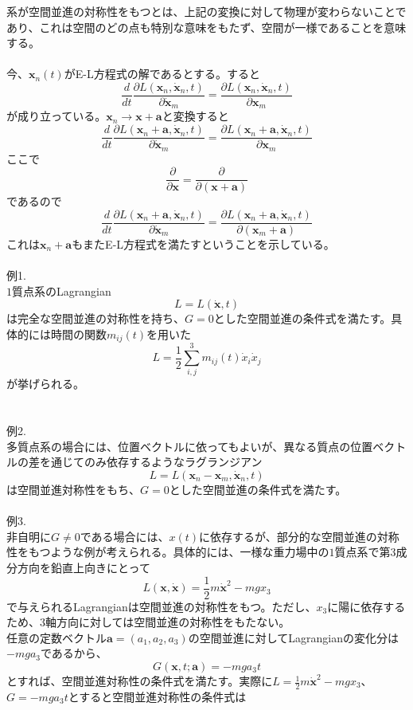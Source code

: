 \documentclass{jsarticle}
\begin{document}
系が空間並進の対称性をもつとは、上記の変換に対して物理が変わらないことであり、これは空間のどの点も特別な意味をもたず、空間が一様であることを意味する。\\
\\
今、\(\bm{x}_{n}(t)\)がE-L方程式の解であるとする。すると
\[\frac{d}{dt}\frac{\partial L(\bm{x}_{n},\dot{\bm{x}}_{n},t)}{\partial\dot{\bm{x}}_{m}}=\frac{\partial L(\bm{x}_{n},\dot{\bm{x}}_{n},t)}{\partial\bm{x}_{m}}\]
が成り立っている。\(\bm{x}_{n}\to\bm{x}+\bm{a}\)と変換すると
\[\frac{d}{dt}\frac{\partial L(\bm{x}_{n}+\bm{a},\dot{\bm{x}}_{n},t)}{\partial\dot{\bm{x}}_{m}}=\frac{\partial L(\bm{x}_{n}+\bm{a},\dot{\bm{x}}_{n},t)}{\partial\bm{x}_{m}}\]
ここで
\[\frac{\partial}{\partial\bm{x}}=\frac{\partial}{\partial(\bm{x}+\bm{a})}\]
であるので
\[\frac{d}{dt}\frac{\partial L(\bm{x}_{n}+\bm{a},\dot{\bm{x}}_{n},t)}{\partial\dot{\bm{x}}_{m}}=\frac{\partial L(\bm{x}_{n}+\bm{a},\dot{\bm{x}}_{n},t)}{\partial(\bm{x}_{m}+\bm{a})}\]
これは\(\bm{x}_{n}+\bm{a}\)もまたE-L方程式を満たすということを示している。\\
\\
例1.\\
\(1\)質点系のLagrangian
\[L=L(\dot{\bm{x}},t)\]
は完全な空間並進の対称性を持ち、\(G=0\)とした空間並進の条件式を満たす。具体的には時間の関数\(m_{ij}(t)\)を用いた
\[L=\frac{1}{2}\sum_{i,j}^{3}m_{ij}(t)\dot{x}_{i}\dot{x}_{j}\]
が挙げられる。\\
\\
\\
例2.\\
多質点系の場合には、位置ベクトルに依ってもよいが、異なる質点の位置ベクトルの差を通じてのみ依存するようなラグランジアン
\[L=L(\bm{x}_{n}-\bm{x}_{m},\dot{\bm{x}}_{n},t)\]
は空間並進対称性をもち、\(G=0\)とした空間並進の条件式を満たす。\\
\\
例3.\\
非自明に\(G\ne0\)である場合には、\(x(t)\)に依存するが、部分的な空間並進の対称性をもつような例が考えられる。具体的には、一様な重力場中の\(1\)質点系で第\(3\)成分方向を鉛直上向きにとって
\[L(\bm{x},\dot{\bm{x}})=\frac{1}{2}m{\dot{\bm{x}}}^{2}-mgx_{3}\]
で与えられるLagrangianは空間並進の対称性をもつ。ただし、\(x_{3}\)に陽に依存するため、\(3\)軸方向に対しては空間並進の対称性をもたない。\\
任意の定数ベクトル\(\bm{a}=(a_{1},a_{2},a_{3})\)の空間並進に対してLagrangianの変化分は\(-mga_{3}\)であるから、
\[G(\bm{x},t;\bm{a})=-mga_{3}t\]
とすれば、空間並進対称性の条件式を満たす。実際に\(L=\frac{1}{2}m\dot{\bm{x}}^{2}-mgx_{3}\)、\(G=-mga_{3}t\)とすると空間並進対称性の条件式は
\end{document}

